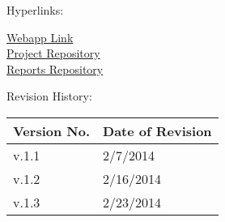 {

Hyperlinks:\\
\begin{center}
\href{http://192.241.248.91}{Webapp Link}\\
\href{https://github.com/dkarivalis/SEP_SMIFL}{Project Repository}\\
\href{https://github.com/dkarivalis/SEP_SMIFL_reports}{Reports Repository}\\
\end{center}

Revision History:
\begin{longtable}{|p{1.6in}|p{2.6in}|}
\hline
{\large\color{color1}Version No.}&{\large \color{color1}Date of Revision}\\\hline
v.1.1&2/7/2014  \\ \hline
v.1.2&2/16/2014 \\ \hline
v.1.3&2/23/2014 \\ \hline
\end{longtable}

\vspace{20mm}\

}

